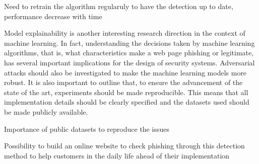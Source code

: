 \documentclass{article}
\begin{document}
    Need to retrain the algorithm regularuly to have the detection up to date, performance decrease with time

    Model explainability is another interesting research direction
    in the context of machine learning. In fact, understanding
    the decisions taken by machine learning algorithms, that is,
    what characteristics make a web page phishing or legitimate,
    has several important implications for the design of security
    systems. Adversarial attacks should also be investigated to
    make the machine learning models more robust.
    It is also important to outline that, to ensure the advancement
    of the state of the art, experiments should be made reproducible.
    This means that all implementation details should
    be clearly specified and the datasets used should be made
    publicly available.

    Importance of public datasets to reproduce the issues

    Possibility to build an online website to check phishing through this detection method to help customers in the daily life ahead of their implementation

    
    
\end{document}
